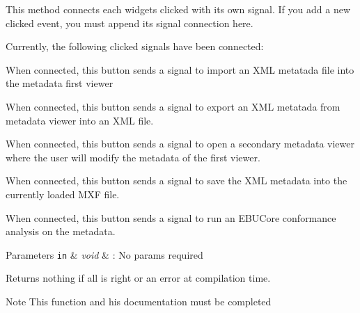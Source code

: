 This method connects each widgets clicked with its own signal. If you add a new clicked event, you must append its signal connection here.\par
 \par
 Currently, the following clicked signals have been connected\-:\par
 \begin{DoxyItemize}
\item { When} connected, this button sends a signal to import an X\-M\-L metatada file into the metadata first viewer \item { When} connected, this button sends a signal to export an X\-M\-L metatada from metadata viewer into an X\-M\-L file. \item { When} connected, this button sends a signal to open a secondary metadata viewer where the user will modify the metadata of the first viewer. \item { When} connected, this button sends a signal to save the X\-M\-L metadata into the currently loaded M\-X\-F file. \item { When} connected, this button sends a signal to run an E\-B\-U\-Core conformance analysis on the metadata.\par
 \par
 
\begin{DoxyParams}[1]{Parameters}
\mbox{\tt in}  & {\em void} & \-: No params required \\
\hline
\end{DoxyParams}
\begin{DoxyReturn}{Returns}
nothing if all is right or an error at compilation time. 
\end{DoxyReturn}
\begin{DoxyNote}{Note}
This function and his documentation must be completed 
\end{DoxyNote}
\end{DoxyItemize}


